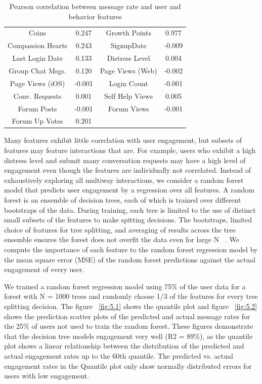 \begin{table}
	\centering
	\begin{tabular}{c | c || c | c} 
	
		
	    Coins & 0.247 & Growth Points & 0.977 \\
	    Compassion Hearts & 0.243 & SignupDate & -0.009 \\
	    Last Login Date & 0.133 & Distress Level & 0.004 \\
	    Group Chat Msgs. & 0.120 & Page Views (Web) & -0.002 \\
	    Page Views (iOS) & -0.001 & Login Count & -0.001 \\
	    Conv. Requests & 0.001 & Self Help Views & 0.005 \\
	    Forum Posts & -0.001 & Forum Views & -0.001 \\
	    Forum Up Votes & 0.201 
		
	
	\end{tabular}
	\caption{Pearson correlation between message rate and user and behavior features}
	\label{table 5.1}
\end{table}

Many features exhibit little correlation with user engagement, but subsets of features may feature interactions that are. For example, users who exhibit a high distress level and submit many conversation requests may have a high level of engagement even though the features are individually not correlated. Instead of exhaustively exploring all multiway interactions, we consider a random forest model that predicts user engagement by a regression over all features. A random forest is an ensemble of decision trees, each of which is trained over different bootstraps of the data. During training, each tree is limited to the use of distinct small subsets of the features to make spitting decisions. The bootstraps, limited choice of features for tree splitting, and averaging of results across the tree ensemble ensures the forest does not overfit the data even for large N ~\cite{hastie2009unsupervised}. We compute the importance of each feature to the random forest regression model by the mean square error (MSE) of the random forest predictions against the actual engagement of every user. 

\newpage
We trained a random forest regression model using 75\% of the user data for a forest with N = 1000 trees and randomly choose 1/3 of the features for every tree splitting decision. The  figure ~\ref{fig:5.1}  shows the quantile plot and figure ~\ref{fig:5.2} shows the prediction scatter plots of the predicted and actual message rates for the 25\% of users not used to train the random forest. These figures demonstrate that the decision tree models engagement very well (R2 = 89\%), as the quantile plot shows a linear relationship between the distribution of the predicted and actual engagement rates up to the 60th quantile. The predicted vs. actual engagement rates in the Quantile plot   only show normally distributed errors for users with low engagement. 

